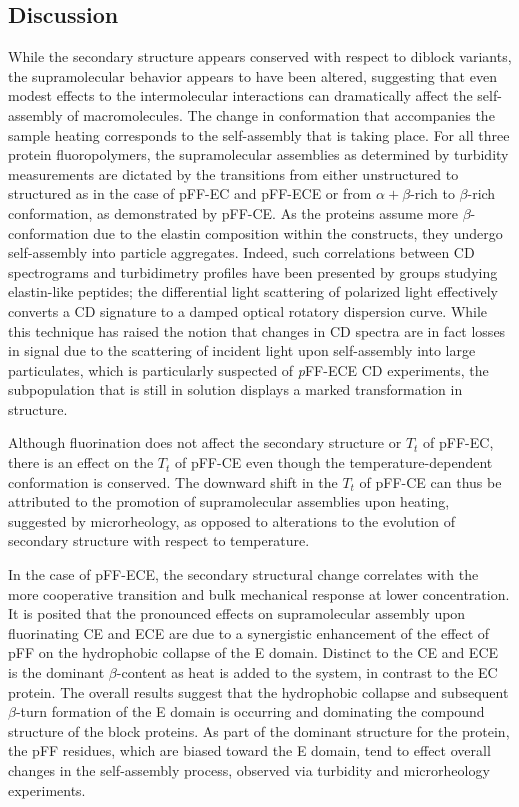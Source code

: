 \begin{refsection}
\section{Discussion}

While the secondary structure appears conserved with respect to diblock
variants, the supramolecular behavior appears to have been altered, suggesting
that even modest effects to the intermolecular interactions can dramatically
affect the self-assembly of macromolecules.\cite{URRY1974} The change in
conformation that accompanies the sample heating corresponds to the
self-assembly that is taking place. For all three protein fluoropolymers, the
supramolecular assemblies as determined by turbidity measurements are dictated
by the transitions from either unstructured to structured as in the case of
pFF-EC and pFF-ECE or from ${\alpha+\beta}$-rich to ${\beta}$-rich conformation,
as demonstrated by pFF-CE. As the proteins assume more ${\beta}$- conformation
due to the elastin composition within the constructs, they undergo self-assembly
into particle aggregates. Indeed, such correlations between CD spectrograms and
turbidimetry profiles have been presented by groups studying elastin-like
peptides; the differential light scattering of polarized light effectively
converts a CD signature to a damped optical rotatory dispersion curve. While
this technique has raised the notion that changes in CD spectra are in fact
losses in signal due to the scattering of incident light upon self-assembly into
large particulates, which is particularly suspected of \emph{p}FF-ECE CD
experiments, the subpopulation that is still in solution displays a marked
transformation in structure.

Although fluorination does not affect the secondary structure or ${T_t}$ of
pFF-EC, there is an effect on the ${T_t}$ of pFF-CE even though the
temperature-dependent conformation is conserved. The downward shift in the
${T_t}$ of pFF-CE can thus be attributed to the promotion of supramolecular
assemblies upon heating, suggested by microrheology, as opposed to alterations
to the evolution of secondary structure with respect to temperature.

In the
case of pFF-ECE, the secondary structural change correlates with the more
cooperative transition and bulk mechanical response at lower concentration. It
is posited that the pronounced effects on supramolecular assembly upon
fluorinating CE and ECE are due to a synergistic enhancement of the effect of
pFF on the hydrophobic collapse of the E domain. Distinct to the CE and ECE is
the dominant ${\beta}$-content as heat is added to the system, in contrast to
the EC protein. The overall results suggest that the hydrophobic collapse and
subsequent ${\beta}$-turn formation of the E domain is occurring and dominating
the compound structure of the block proteins. As part of the dominant structure
for the protein, the pFF residues, which are biased toward the E domain, tend to
effect overall changes in the self-assembly process, observed via turbidity and
microrheology experiments.


\end{refsection}
